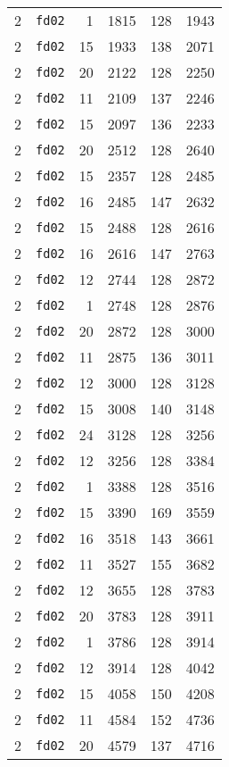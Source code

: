 \documentclass{article}
\begin{document}
\begin{table}[h!]
\begin{tabular}{llrrrl}
    2 & \texttt{fd02} & 1 & 1815 & 128 & 1943 \\
    2 & \texttt{fd02} & 15 & 1933 & 138 & 2071 \\
    2 & \texttt{fd02} & 20 & 2122 & 128 & 2250 \\
    2 & \texttt{fd02} & 11 & 2109 & 137 & 2246 \\
    2 & \texttt{fd02} & 15 & 2097 & 136 & 2233 \\
    2 & \texttt{fd02} & 20 & 2512 & 128 & 2640 \\
    2 & \texttt{fd02} & 15 & 2357 & 128 & 2485 \\
    2 & \texttt{fd02} & 16 & 2485 & 147 & 2632 \\
    2 & \texttt{fd02} & 15 & 2488 & 128 & 2616 \\
    2 & \texttt{fd02} & 16 & 2616 & 147 & 2763 \\
    2 & \texttt{fd02} & 12 & 2744 & 128 & 2872 \\
    2 & \texttt{fd02} & 1 & 2748 & 128 & 2876 \\
    2 & \texttt{fd02} & 20 & 2872 & 128 & 3000 \\
    2 & \texttt{fd02} & 11 & 2875 & 136 & 3011 \\
    2 & \texttt{fd02} & 12 & 3000 & 128 & 3128 \\
    2 & \texttt{fd02} & 15 & 3008 & 140 & 3148 \\
    2 & \texttt{fd02} & 24 & 3128 & 128 & 3256 \\
    2 & \texttt{fd02} & 12 & 3256 & 128 & 3384 \\
    2 & \texttt{fd02} & 1 & 3388 & 128 & 3516 \\
    2 & \texttt{fd02} & 15 & 3390 & 169 & 3559 \\
    2 & \texttt{fd02} & 16 & 3518 & 143 & 3661 \\
    2 & \texttt{fd02} & 11 & 3527 & 155 & 3682 \\
    2 & \texttt{fd02} & 12 & 3655 & 128 & 3783 \\
    2 & \texttt{fd02} & 20 & 3783 & 128 & 3911 \\
    2 & \texttt{fd02} & 1 & 3786 & 128 & 3914 \\
    2 & \texttt{fd02} & 12 & 3914 & 128 & 4042 \\
    2 & \texttt{fd02} & 15 & 4058 & 150 & 4208 \\
    2 & \texttt{fd02} & 11 & 4584 & 152 & 4736 \\
    2 & \texttt{fd02} & 20 & 4579 & 137 & 4716 \\

\end{tabular}
\end{table}
\end{document}
